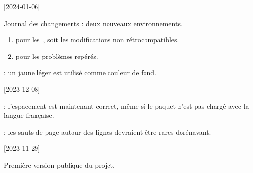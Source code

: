 \tdocsep




[2024-01-06]

\begin{tdocnew}
    \item Journal des changements : deux nouveaux environnements.
    \begin{enumerate}
        \item {} pour les \,, soit les modifications non rétrocompatibles.

        \item {} pour les problèmes repérés.
    \end{enumerate}

    \item {}: un jaune léger est utilisé comme couleur de fond.
\end{tdocnew}

\tdocsep




[2023-12-08]

\begin{tdocfix}
    \item {}: l'espacement est maintenant correct, même si le paquet  n'est pas chargé avec la langue française.

    \item {}: les sauts de page autour des lignes  devraient être rares dorénavant.
\end{tdocfix}

\tdocsep




[2023-11-29]

Première version publique du projet.


